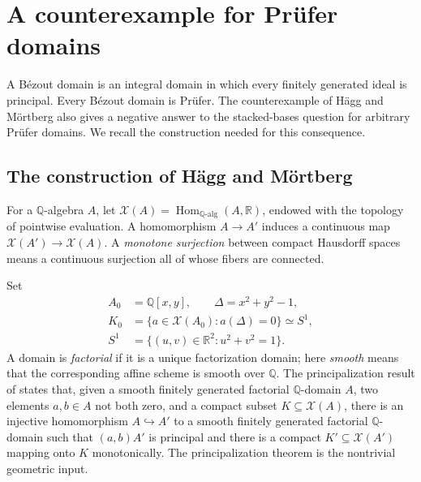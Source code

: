 \documentclass[11pt]{amsart}
\theoremstyle{definition}
\theoremstyle{remark}
\begin{document}
\section{A counterexample for Pr\"ufer domains}
A B\'ezout domain is an integral domain in which every finitely generated
ideal is principal. Every B\'ezout domain is Pr\"ufer. The counterexample
of H\"agg and M\"ortberg \cite{HaggMortberg2026} also gives a negative
answer to the stacked-bases question for arbitrary Pr\"ufer domains.
We recall the construction needed for this consequence.

\subsection*{The construction of H\"agg and M\"ortberg}
For a $\mathbb Q$-algebra $A$, let
$\mathcal X(A)=\operatorname{Hom}_{\mathbb Q\text{-alg}}(A,\mathbb R)$,
endowed with the topology of pointwise evaluation. A homomorphism
$A\to A'$ induces a continuous map $\mathcal X(A')\to\mathcal X(A)$.
A \emph{monotone surjection} between compact Hausdorff spaces means a
continuous surjection all of whose fibers are connected.

Set
\[
\begin{aligned}
 A_0&=\mathbb Q[x,y],\qquad \Delta=x^2+y^2-1,\\
 K_0&=\{a\in\mathcal X(A_0):a(\Delta)=0\}\simeq S^1,\\
 S^1&=\{(u,v)\in\mathbb R^2:u^2+v^2=1\}.
\end{aligned}
\]
A domain is \emph{factorial} if it is a unique factorization domain;
here \emph{smooth} means that the corresponding affine scheme is smooth
over $\mathbb Q$. The principalization result of
\cite[Proposition~4.6]{HaggMortberg2026} states that, given a
smooth finitely generated factorial $\mathbb Q$-domain
$A$, two elements $a,b\in A$ not both zero, and a compact subset
$K\subseteq\mathcal X(A)$, there is an injective homomorphism
$A\hookrightarrow A'$ to a smooth finitely generated factorial
$\mathbb Q$-domain such that $(a,b)A'$ is principal and there is a
compact $K'\subseteq\mathcal X(A')$ mapping onto $K$ monotonically.
The principalization theorem is the nontrivial geometric input.
\end{document}
